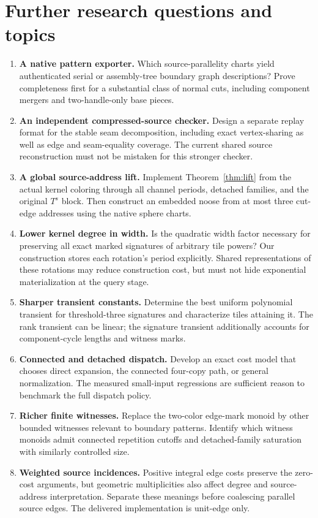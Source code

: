 \documentclass[11pt]{article}
\theoremstyle{remark}\newtheorem{remark}[theorem]{Remark}
\begin{document}
\section{Further research questions and topics}
\begin{enumerate}[leftmargin=*,itemsep=.65em]
\item \textbf{A native pattern exporter.} Which source-parallelity charts yield authenticated serial or assembly-tree boundary graph descriptions? Prove completeness first for a substantial class of normal cuts, including component mergers and two-handle-only base pieces.
\item \textbf{An independent compressed-source checker.} Design a separate replay format for the stable seam decomposition, including exact vertex-sharing as well as edge and seam-equality coverage. The current shared source reconstruction must not be mistaken for this stronger checker.
\item \textbf{A global source-address lift.} Implement Theorem~\ref{thm:lift} from the actual kernel coloring through all channel periods, detached families, and the original $T^s$ block. Then construct an embedded noose from at most three cut-edge addresses using the native sphere charts.
\item \textbf{Lower kernel degree in width.} Is the quadratic width factor necessary for preserving all exact marked signatures of arbitrary tile powers? Our construction stores each rotation's period explicitly. Shared representations of these rotations may reduce construction cost, but must not hide exponential materialization at the query stage.
\item \textbf{Sharper transient constants.} Determine the best uniform polynomial transient for threshold-three signatures and characterize tiles attaining it. The rank transient can be linear; the signature transient additionally accounts for component-cycle lengths and witness marks.
\item \textbf{Connected and detached dispatch.} Develop an exact cost model that chooses direct expansion, the connected four-copy path, or general normalization. The measured small-input regressions are sufficient reason to benchmark the full dispatch policy.
\item \textbf{Richer finite witnesses.} Replace the two-color edge-mark monoid by other bounded witnesses relevant to boundary patterns. Identify which witness monoids admit connected repetition cutoffs and detached-family saturation with similarly controlled size.
\item \textbf{Weighted source incidences.} Positive integral edge costs preserve the zero-cost arguments, but geometric multiplicities also affect degree and source-address interpretation. Separate these meanings before coalescing parallel source edges. The delivered implementation is unit-edge only.

\end{enumerate}
\end{document}
